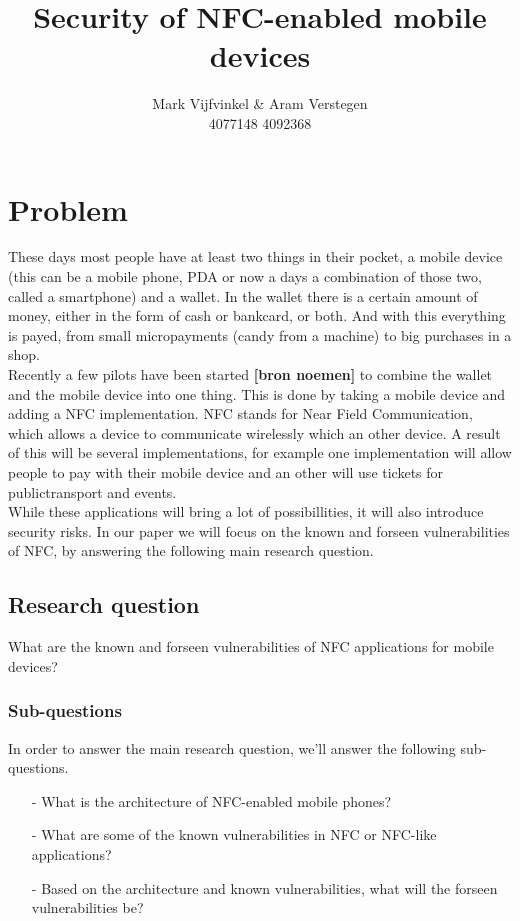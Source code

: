 \documentclass[11pt]{article} %
\title{Security of NFC-enabled mobile devices}
\author{Mark Vijfvinkel \& Aram Verstegen \\ 4077148 4092368}
\date{} %
\begin{document}
\maketitle


\section{Problem}

These days most people have at least two things in their pocket, a mobile device (this can be a mobile phone, PDA or now a days a combination of those two, called a smartphone) and a wallet. In the wallet there is a certain amount of money, either in the form of cash or bankcard, or both. And with this everything is payed, from small micropayments (candy from a machine) to big purchases in a shop.
\\ Recently a few pilots have been started \textbf { [bron noemen]} to combine the wallet and the mobile device into one thing. This is done by taking a mobile device and adding a NFC implementation. NFC stands for Near Field Communication, which allows a device to communicate wirelessly which an other device. A result of this will be several implementations, for example one implementation will allow people to pay with their mobile device and an other will use tickets for publictransport and events. 
\\ While these applications will bring a lot of possibillities, it will also introduce security risks. In our paper we will focus on the known and forseen vulnerabilities of NFC, by answering the following main research question.

\subsection{Research question}

What are the known and forseen vulnerabilities of NFC applications for mobile devices? %

\subsubsection{Sub-questions}

In order to answer the main research question, we'll answer the following sub-questions.
\begin{itemize}
\item [-] What is the architecture of NFC-enabled mobile phones?

\item [-] What are some of the known vulnerabilities in NFC or NFC-like applications?

\item [-] Based on the architecture and known vulnerabilities, what will the forseen vulnerabilities be?

\end{itemize}
\end{document}
